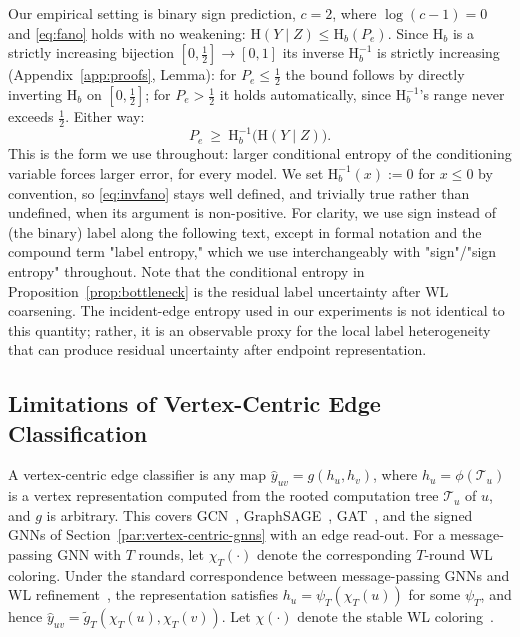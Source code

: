 \documentclass[sigconf]{acmart}
\newcommand{\Hh}{\mathrm{H}}
\theoremstyle{plain}
\theoremstyle{definition}
\begin{document}
Our empirical setting is binary sign prediction, $c=2$, where $\log(c-1)=0$ and \eqref{eq:fano} holds with no weakening: $\Hh(Y\mid Z)\le \Hh_b(P_e)$. Since $\Hh_b$ is a strictly increasing bijection $[0,\tfrac12]\to[0,1]$ its inverse $\Hh_b^{-1}$ is strictly increasing (Appendix~\ref{app:proofs}, Lemma): for $P_e\le\tfrac12$ the bound follows by directly inverting $\Hh_b$ on $[0,\tfrac12]$; for $P_e>\tfrac12$ it holds automatically, since $\Hh_b^{-1}$'s range never exceeds $\tfrac12$. Either way:
\begin{equation}
P_e\ \ge\ \Hh_b^{-1}\big(\Hh(Y\mid Z)\big).
\label{eq:invfano}
\end{equation}
This is the form we use throughout: larger conditional entropy of the conditioning variable forces larger error, for every model. We set $\Hh_b^{-1}(x):=0$ for $x\le 0$ by convention, so \eqref{eq:invfano} stays well defined, and trivially true rather than undefined, when its argument is non-positive. For clarity, we use sign instead of (the binary) label along the following text, except in formal notation and the compound term "label entropy," which we use interchangeably with "sign"/"sign entropy" throughout. 
Note that the conditional entropy in Proposition~\ref{prop:bottleneck} is the residual label uncertainty after WL coarsening. The incident-edge entropy used in our experiments is not identical to this quantity; rather, it is an observable proxy for the local label heterogeneity that can produce residual uncertainty after endpoint representation.

\subsection{Limitations of Vertex-Centric Edge Classification}
A vertex-centric edge classifier is any map $\hat y_{uv}=g(h_u,h_v)$, where $h_u=\phi(\mathcal{T}_u)$ is a vertex representation computed from the rooted computation tree $\mathcal{T}_u$ of $u$, and $g$ is arbitrary. This covers GCN~\citep{kipf2017semi}, GraphSAGE~\citep{hamilton2017inductive}, GAT~\citep{velickovic2018graph}, and the signed GNNs of Section~\ref{par:vertex-centric-gnns} with an edge read-out. For a message-passing GNN with $T$ rounds, let $\chi_T(\cdot)$ denote the corresponding $T$-round WL coloring. Under the standard correspondence between message-passing GNNs and WL refinement~\citep{xu2019powerful, morris2019weisfeiler}, the representation satisfies $h_u=\psi_T(\chi_T(u))$ for some $\psi_T$, and hence $\hat y_{uv}=\tilde g_T(\chi_T(u),\chi_T(v))$. Let $\chi(\cdot)$ denote the stable WL coloring~\citep{weisfeiler1968reduction}. 
\end{document}
